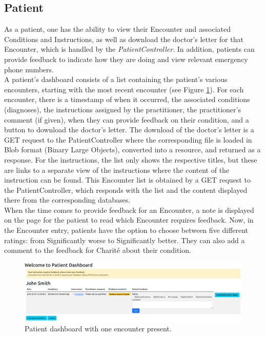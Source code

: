 \documentclass[]{report}
\begin{document}
\subsection{Patient}
As a patient, one has the ability to view their Encounter and associated Conditions and Instructions, as well as download the doctor's letter for that Encounter, which is handled by the \textit{PatientController}. In addition, patients can provide feedback to indicate how they are doing and view relevant emergency phone numbers.\\
A patient's dashboard consists of a list containing the patient's various encounters, starting with the most recent encounter (see Figure \ref{fig:patient_dashboard}). For each encounter, there is a timestamp of when it occurred, the associated conditions (diagnoses), the instructions assigned by the practitioner, the practitioner's comment (if given), when they can provide feedback on their condition, and a button to download the doctor's letter. The download of the doctor's letter is a GET request to the PatientController where the corresponding file is loaded in Blob format (Binary Large Objects), converted into a resource, and returned as a response. For the instructions, the list only shows the respective titles, but these are links to a separate view of the instructions where the content of the instruction can be found. This Encounter list is obtained by a GET request to the PatientController, which responds with the list and the content displayed there from the corresponding databases.\\
When the time comes to provide feedback for an Encounter, a note is displayed on the page for the patient to read which Encounter requires feedback. Now, in the Encounter entry, patients have the option to choose between five different ratings: from Significantly worse to Significantly better. They can also add a comment to the feedback for Charité about their condition.

\begin{figure}[h]
    \centering
    \includegraphics[width=1\textwidth]{Patient_Dashboard.png}
    \caption{Patient dashboard with one encounter present.}
    \label{fig:patient_dashboard}
\end{figure}
\end{document}

